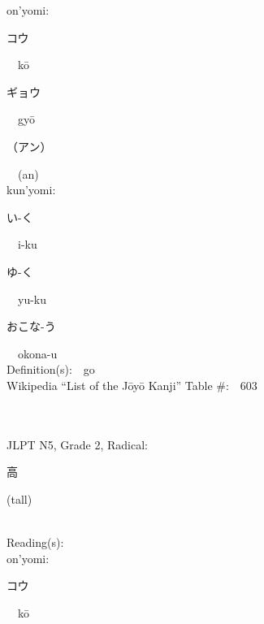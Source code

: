 \begin{multicols}{2}
{\hspace*{1em}}on'yomi:\ \ \\
{\hspace*{2em}}{\begin{CJK}{UTF8}{min} コウ \end{CJK}}\ \ k\=o\ \ \\
{\hspace*{2em}}{\begin{CJK}{UTF8}{min} ギョウ \end{CJK}}\ \ gy\=o\ \ \\
{\hspace*{2em}}{\begin{CJK}{UTF8}{min} （アン） \end{CJK}}\ \ (an)\ \ \\
{\hspace*{1em}}kun'yomi:\ \ \\
{\hspace*{2em}}{\begin{CJK}{UTF8}{min} い-く \end{CJK}}\ \ i-ku\ \ \\
{\hspace*{2em}}{\begin{CJK}{UTF8}{min} ゆ-く \end{CJK}}\ \ yu-ku\ \ \\
{\hspace*{2em}}{\begin{CJK}{UTF8}{min} おこな-う \end{CJK}}\ \ okona-u\ \ \\
Definition(s):\ \ go \\
Wikipedia ``List of the J\=oy\=o Kanji'' Table \#:\ \ 603 \\
\ \ \\
{\fontsize{34pt}{40pt}  }\ \ \\  %
{JLPT N5, Grade 2, Radical:\ \ {\begin{CJK}{UTF8}{min} 高 \end{CJK}} (tall) } \\
Reading(s):\ \ \\
{\hspace*{1em}}on'yomi:\ \ \\
{\hspace*{2em}}{\begin{CJK}{UTF8}{min} コウ \end{CJK}}\ \ k\=o\ \ \\

\end{multicols}
